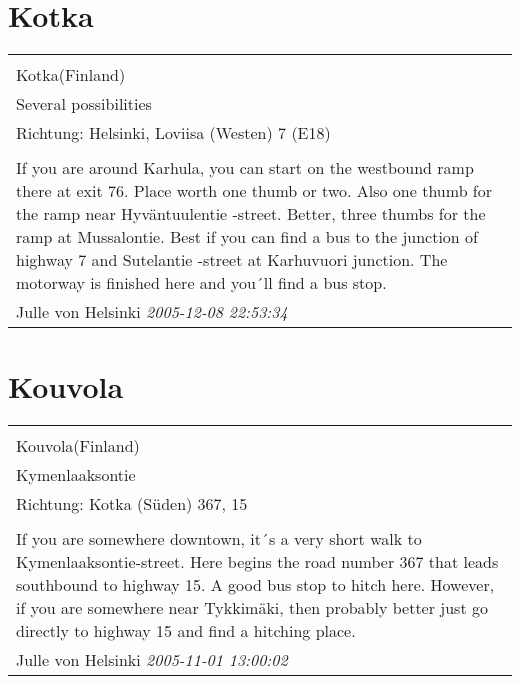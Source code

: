 \documentclass[a4paper,12pt]{article}
\begin{document}
\section{Kotka}
\begin{tabular}{|p{13cm}|}
\hline\\
Kotka(Finland)\\
Several possibilities\\
Richtung: Helsinki, Loviisa (Westen) 7 (E18) \\
\hline\\
If you are around Karhula, you can start on the westbound ramp there at exit 76. Place worth one thumb or two.
Also one thumb for the ramp near Hyväntuulentie -street.
Better, three thumbs for the ramp at Mussalontie.
Best if you can find a bus to the junction of highway 7 and Sutelantie -street at Karhuvuori junction. The motorway is finished here and you´ll find a bus stop. \\
Julle von Helsinki \textit{ 2005-12-08 22:53:34 }\\\hline
\end{tabular}


\section{Kouvola}
\begin{tabular}{|p{13cm}|}
\hline\\
Kouvola(Finland)\\
Kymenlaaksontie\\
Richtung: Kotka (Süden) 367, 15 \\
\hline\\
If you are somewhere downtown, it´s a very short walk to Kymenlaaksontie-street. Here begins the road number 367 that leads southbound to highway 15. A good bus stop to hitch here. However, if you are somewhere near Tykkimäki, then probably better just go directly to highway 15 and find a hitching place. \\
Julle von Helsinki \textit{ 2005-11-01 13:00:02 }\\\hline
\end{tabular}
\end{document}
